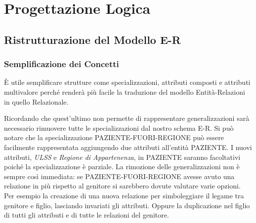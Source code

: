 \documentclass{article}
\begin{document}
                 







\clearpage
\section{Progettazione Logica}


\subsection{Ristrutturazione del Modello E-R}
\subsubsection{Semplificazione dei Concetti}

È utile semplificare strutture come specializzazioni, attributi composti e
attributi multivalore perché renderà più facile la traduzione del modello
Entità-Relazioni in quello Relazionale.

Ricordando che quest'ultimo non permette di rappresentare generalizzazioni sarà
necessario rimuovere tutte le specializzazioni dal nostro schema E-R.  Si può
notare che la specializzazione PAZIENTE-FUORI-REGIONE può essere facilmente
rappresentata aggiungendo due attributi all'entità PAZIENTE.  I nuovi
attributi, \textit{ULSS} e \textit{Regione di Appartenenza}, in PAZIENTE
saranno facoltativi poiché la specializzazione è parziale.  La rimozione delle
generalizzazioni non è sempre così immediata: se PAZIENTE-FUORI-REGIONE avesse
avuto una relazione in più rispetto al genitore si sarebbero dovute valutare
varie opzioni.  Per esempio la creazione di una nuova relazione per
simboleggiare il legame tra genitore e figlio, lasciando invariati gli
attributi.  Oppure la duplicazione nel figlio di tutti gli attributi e di tutte
le relazioni del genitore.
\end{document}

